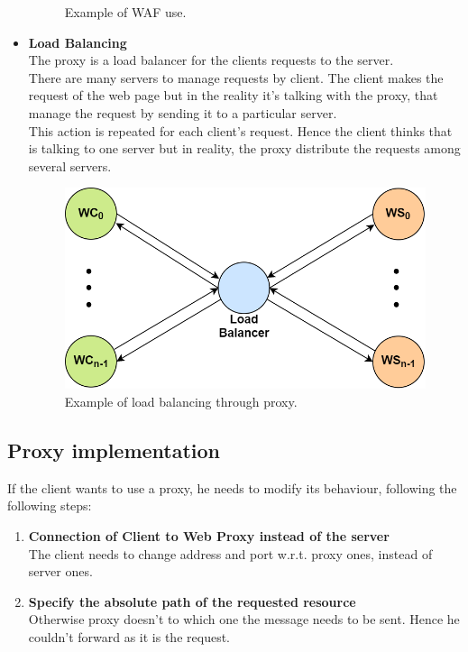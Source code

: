 \begin{itemize}
{\begin{figure}[h]
\caption{\footnotesize{Example of WAF use.}}\label{proxy_waf}
\end{figure}
}
\item{\textbf{Load Balancing}\\
The proxy is a load balancer for the clients requests to the server.\\
There are many servers to manage requests by client. The client makes the request of the web page but in the reality it's talking with the proxy, that manage the request by sending it to a particular server.\\
This action is repeated for each client's request. Hence the client thinks that is talking to one server but in reality, the proxy distribute the requests among several servers. 
\begin{figure}[h]
\centering
\includegraphics[scale=0.4]{Images/Gateway/proxy_load}
\caption{\footnotesize{Example of load balancing through proxy.}}\label{proxy_load}
\end{figure}
}
\end{itemize}

\subsection{Proxy implementation}
If the client wants to use a proxy, he needs to modify its behaviour, following the following steps:
\begin{enumerate}
\item{\textbf{Connection of Client to Web Proxy instead of the server}\\
The client needs to change address and port w.r.t. proxy ones, instead of server ones.}
\item{\textbf{Specify the absolute path of the requested resource}\\
Otherwise proxy doesn't to which one the message needs to be sent. Hence he couldn't forward as it is the request.
}
\end{enumerate}